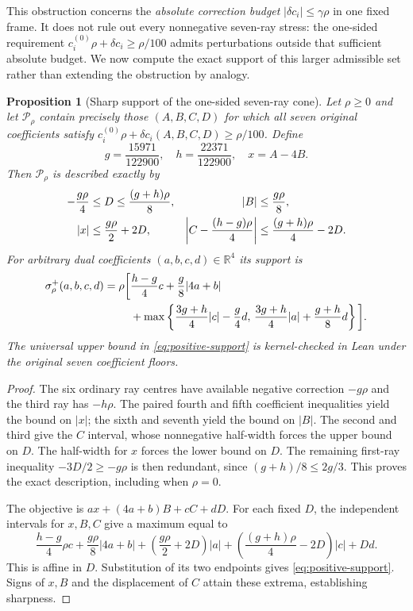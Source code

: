\documentclass[11pt,a4paper]{article}
\theoremstyle{plain}
\newtheorem{proposition}[theorem]{Proposition}
\theoremstyle{definition}
\newcommand{\R}{\mathbb{R}}
\begin{document}
This obstruction concerns the \emph{absolute correction budget}
$|\delta c_i|\le\gamma\rho$ in one fixed frame. It does not rule
out every nonnegative seven-ray stress: the one-sided requirement
$c_i^{(0)}\rho+\delta c_i\ge\rho/100$ admits perturbations outside
that sufficient absolute budget. We now compute the exact support
of this larger admissible set rather than extending the obstruction
by analogy.

\begin{proposition}[Sharp support of the one-sided seven-ray cone]
\label{prop:positive-support}
Let $\rho\ge0$ and let $\mathcal P_\rho$ contain precisely those
$(A,B,C,D)$ for which all seven original coefficients satisfy
$c_i^{(0)}\rho+\delta c_i(A,B,C,D)\ge\rho/100$. Define
\[
 g=\frac{15971}{122900},\quad h=\frac{22371}{122900},\quad
 x=A-4B.
\]
Then $\mathcal P_\rho$ is described exactly by
\begin{align}
 -\frac{g\rho}{4}&\le D\le\frac{(g+h)\rho}{8},
 &|B|&\le\frac{g\rho}{8},\notag\\
 |x|&\le\frac{g\rho}{2}+2D,
 &\left|C-\frac{(h-g)\rho}{4}\right|
 &\le\frac{(g+h)\rho}{4}-2D.\label{eq:positive-intervals}
\end{align}
For arbitrary dual coefficients $(a,b,c,d)\in\R^4$ its support is
\begin{align}
 \sigma^+_\rho(a,b,c,d)
 =\rho\bigg[&\frac{h-g}{4}c+\frac g8|4a+b|\notag\\
 &+\max\left\{
 \frac{3g+h}{4}|c|-\frac g4d,\,
 \frac{3g+h}{4}|a|+\frac{g+h}{8}d
 \right\}\bigg].\label{eq:positive-support}
\end{align}
The universal upper bound in \eqref{eq:positive-support} is
kernel-checked in Lean under the original seven coefficient floors.
\end{proposition}

\begin{proof}
The six ordinary ray centres have available negative correction
$-g\rho$ and the third ray has $-h\rho$. The paired fourth and
fifth coefficient inequalities yield the bound on $|x|$; the
sixth and seventh yield the bound on $|B|$. The second and third
give the $C$ interval, whose nonnegative half-width forces the
upper bound on $D$. The half-width for $x$ forces the lower bound
on $D$. The remaining first-ray inequality $-3D/2\ge-g\rho$
is then redundant, since $(g+h)/8\le2g/3$. This proves the exact
description, including when $\rho=0$.

The objective is
$ax+(4a+b)B+cC+dD$. For each fixed $D$, the independent intervals
for $x,B,C$ give a maximum equal to
\[
 \frac{h-g}{4}\rho c+\frac{g\rho}{8}|4a+b|
 +\left(\frac{g\rho}{2}+2D\right)|a|
 +\left(\frac{(g+h)\rho}{4}-2D\right)|c|+Dd.
\]
This is affine in $D$. Substitution of its two endpoints gives
\eqref{eq:positive-support}. Signs of $x,B$ and the displacement
of $C$ attain these extrema, establishing sharpness.
\end{proof}
\end{document}
